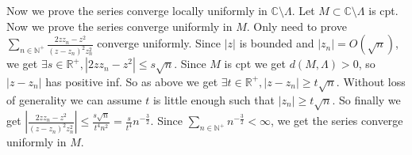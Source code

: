 \documentclass{ctexart}
\begin{document}
\begin{solution}
  Now we prove the series converge locally uniformly in \(\mathbb{C}\setminus \Lambda\). 
  Let \(M \subset\mathbb{C}\setminus \Lambda\) is cpt. Now we prove the series converge uniformly in \(M\). 
  Only need to prove \(\sum_{n \in \mathbb{N}^+} \frac{2z z_n-z^2}{(z-z_n)^2 z_n^2}\) converge uniformly. 
  Since \(|z|\) is bounded and \(|z_n|=O(\sqrt{n})\), we get \(\exists s \in \mathbb{R}^+,| 2z z_n-z^2| \leq s \sqrt{n}\). 
  Since \(M\) is cpt we get \(d(M,\Lambda)>0\), so \(|z-z_n|\) has positive inf. 
  So as above we get \(\exists t \in \mathbb{R}^+,|z-z_n| \geq t \sqrt{n}\). 
  Without loss of generality we can assume \(t\) is little enough such that \(|z_n|\geq t \sqrt{n}\). 
  So finally we get \(\left|\frac{2z z_n - z^2}{(z-z_n)^2 z_n^2}\right| \leq \frac{s \sqrt{n}}{t^4 n^2}=\frac{s}{t^4} n^{-\frac{3}{2}}\). 
  Since \(\sum_{n \in \mathbb{N}^+} n^{-\frac{3}{2}}<\infty\), we get the series converge uniformly in \(M\). 
  
\end{solution}
\end{document}
